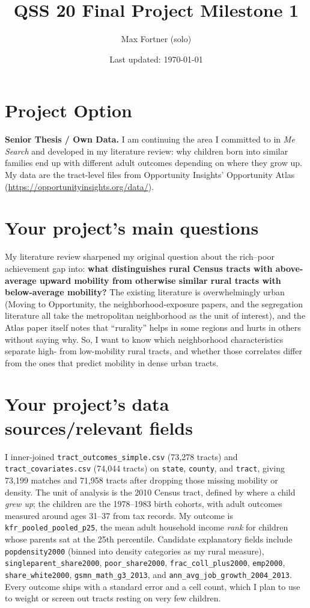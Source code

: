\documentclass[11pt]{article}
\title{QSS 20 Final Project Milestone 1}
\author{Max Fortner (solo)}
\date{Last updated: \today}
\begin{document}
\maketitle

\section{Project Option}

\textbf{Senior Thesis / Own Data.} I am continuing the area I committed to in
\textit{Me Search} and developed in my literature review: why children born into
similar families end up with different adult outcomes depending on where they grow
up. My data are the tract-level files from Opportunity Insights' Opportunity Atlas
(\url{https://opportunityinsights.org/data/}).

\section{Your project's main questions}

My literature review sharpened my original question about the rich--poor achievement
gap into: \textbf{what distinguishes
rural Census tracts with above-average upward mobility from otherwise similar rural
tracts with below-average mobility?} The existing literature is overwhelmingly urban
(Moving to Opportunity, the neighborhood-exposure papers, and the segregation
literature all take the metropolitan neighborhood as the unit of interest), and the
Atlas paper itself notes that ``rurality'' helps in some regions and hurts in others
without saying why. So, I want to know which neighborhood characteristics separate
high- from low-mobility rural tracts, and whether those correlates differ from the
ones that predict mobility in dense urban tracts.

\section{Your project's data sources/relevant fields}

\begin{sloppypar}
I inner-joined \texttt{tract\_outcomes\_simple.csv} (73{,}278 tracts) and
\texttt{tract\_covariates.csv} (74{,}044 tracts) on \texttt{state}, \texttt{county},
and \texttt{tract}, giving 73{,}199 matches and 71{,}958 tracts after dropping those
missing mobility or density. The unit of analysis is the 2010 Census tract, defined
by where a child \textit{grew up}; the children are the 1978--1983 birth cohorts,
with adult outcomes measured around ages 31--37 from tax records. My outcome is
\texttt{kfr\_pooled\_pooled\_p25}, the mean adult household income \textit{rank} for
children whose parents sat at the 25th percentile. Candidate explanatory fields
include \texttt{popdensity2000} (binned into density categories as my rural measure),
\texttt{singleparent\_share2000}, \texttt{poor\_share2000},
\texttt{frac\_coll\_plus2000}, \texttt{emp2000}, \texttt{share\_white2000},
\texttt{gsmn\_math\_g3\_2013}, and \texttt{ann\_avg\_job\_growth\_2004\_2013}. Every
outcome ships with a standard error and a cell count, which I plan to use to weight
or screen out tracts resting on very few children.
\end{sloppypar}
\end{document}
